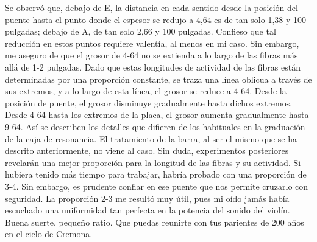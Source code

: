 Se observó que, debajo de E, la distancia en cada sentido desde la posición del puente hasta el punto donde el espesor se redujo a 4,64 es de tan solo 1,38 y 100 pulgadas; debajo de A, de tan solo 2,66 y 100 pulgadas.
Confieso que tal reducción en estos puntos requiere valentía, al menos en mi caso. Sin embargo, me aseguro de que el grosor de 4-64 no se extienda a lo largo de las fibras más allá de 1-2 pulgadas. Dado que estas longitudes de actividad de las fibras están determinadas por una proporción constante, se traza una línea oblicua a través de sus extremos, y a lo largo de esta línea, el grosor se reduce a 4-64. Desde la posición de puente, el grosor disminuye gradualmente hasta dichos extremos. Desde 4-64 hasta los extremos de la placa, el grosor aumenta gradualmente hasta 9-64.
Así se describen los detalles que difieren de los habituales en la graduación de la caja de resonancia. El tratamiento de la barra, al ser el mismo que se ha descrito anteriormente, no viene al caso.
Sin duda, experimentos posteriores revelarán una mejor proporción para la longitud de las fibras y su actividad. Si hubiera tenido más tiempo para trabajar, habría probado con una proporción de 3-4.
Sin embargo, es prudente confiar en ese puente que nos permite cruzarlo con seguridad. La proporción 2-3 me resultó muy útil, pues mi oído jamás había escuchado una uniformidad tan perfecta en la potencia del sonido del violín.
Buena suerte, pequeño ratio.
Que puedas reunirte con tus parientes de 200 años en el cielo de Cremona.
